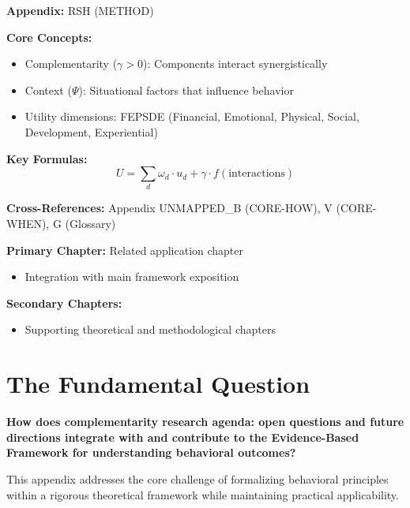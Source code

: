 \begin{tcolorbox}[colback=blue!5!white, colframe=blue!75!black,
    title=Quick Reference: Complementarity Research Agenda: Open Questions and Future Directions]

\textbf{Appendix:} RSH (METHOD)

\textbf{Core Concepts:}
\begin{itemize}[nosep]
\item Complementarity ($\gamma > 0$): Components interact synergistically
\item Context ($\Psi$): Situational factors that influence behavior
\item Utility dimensions: FEPSDE (Financial, Emotional, Physical, Social, Development, Experiential)
\end{itemize}

\textbf{Key Formulas:}
\begin{equation}
U = \sum_d \omega_d \cdot u_d + \gamma \cdot f(\text{interactions})
\end{equation}

\textbf{Cross-References:} Appendix UNMAPPED_B (CORE-HOW), V (CORE-WHEN), G (Glossary)
\end{tcolorbox}


\begin{tcolorbox}[colback=purple!5!white, colframe=purple!75!black,
    title=Chapter Linkage]

\textbf{Primary Chapter:} Related application chapter
\begin{itemize}[nosep]
\item Integration with main framework exposition
\end{itemize}

\textbf{Secondary Chapters:}
\begin{itemize}[nosep]
\item Supporting theoretical and methodological chapters
\end{itemize}

\end{tcolorbox}

\section{The Fundamental Question}
\label{sec:rsh-fundamental}

\begin{tcolorbox}[
    colback=red!5!white,
    colframe=red!75!black,
    title={\textbf{Fundamental Question}}
]
\textbf{How does complementarity research agenda: open questions and future directions integrate with and contribute to the
Evidence-Based Framework for understanding behavioral outcomes?}

This appendix addresses the core challenge of formalizing behavioral principles
within a rigorous theoretical framework while maintaining practical applicability.
\end{tcolorbox}








